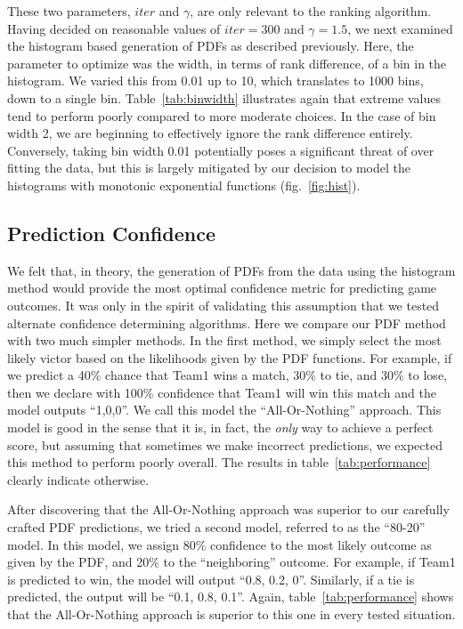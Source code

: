 \documentclass{llncs}
\begin{document}
These two parameters, $iter$ and $\gamma$, are only relevant to the ranking algorithm. Having decided on reasonable values of $iter = 300$ and $\gamma = 1.5$, we next examined the histogram based generation of PDFs as described previously. Here, the parameter to optimize was the width, in terms of rank difference, of a bin in the histogram. We varied this from 0.01 up to 10, which translates to 1000 bins, down to a single bin. Table~\ref{tab:binwidth} illustrates again that extreme values tend to perform poorly compared to more moderate choices. In the case of bin width 2, we are beginning to effectively ignore the rank difference entirely. Conversely, taking bin width 0.01 potentially poses a significant threat of over fitting the data, but this is largely mitigated by our decision to model the histograms with monotonic exponential functions (fig.~\ref{fig:hist}).

\subsection{Prediction Confidence}

We felt that, in theory, the generation of PDFs from the data using the histogram method would provide the most optimal confidence metric for predicting game outcomes. It was only in the spirit of validating this assumption that we tested alternate confidence determining algorithms. Here we compare our PDF method with two much simpler methods. In the first method, we simply select the most likely victor based on the likelihoods given by the PDF functions. For example, if we predict a 40\% chance that Team1 wins a match, 30\% to tie, and 30\% to lose, then we declare with 100\% confidence that Team1 will win this match and the model outputs ``1,0,0''. We call this model the ``All-Or-Nothing'' approach. This model is good in the sense that it is, in fact, the \emph{only} way to achieve a perfect score, but assuming that sometimes we make incorrect predictions, we expected this method to perform poorly overall. The results in table~\ref{tab:performance} clearly indicate otherwise.

After discovering that the All-Or-Nothing approach was superior to our carefully crafted PDF predictions, we tried a second model, referred to as the ``80-20'' model. In this model, we assign 80\% confidence to the most likely outcome as given by the PDF, and 20\% to the ``neighboring'' outcome. For example, if Team1 is predicted to win, the model will output ``0.8, 0.2, 0''. Similarly, if a tie is predicted, the output will be ``0.1, 0.8, 0.1''. Again, table~\ref{tab:performance} shows that the All-Or-Nothing approach is superior to this one in every tested situation.
\end{document}
